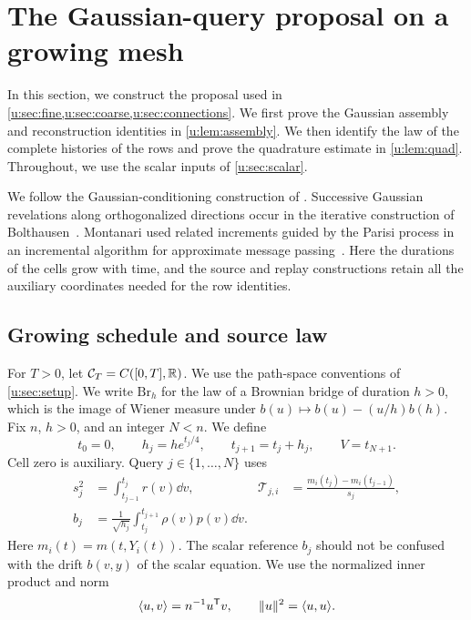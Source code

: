 \chapter{The Gaussian-query proposal on a growing mesh}\label{u:sec:proposal}

In this section, we construct the proposal used in
\cref{u:sec:fine,u:sec:coarse,u:sec:connections}. We first prove the
Gaussian assembly and reconstruction identities in
\cref{u:lem:assembly}. We then identify the law of the complete histories of the rows and prove the quadrature estimate in \cref{u:lem:quad}.
Throughout, we use the scalar inputs of \cref{u:sec:scalar}.

We follow the Gaussian-conditioning construction of
\cite[Section~4]{oai-typical-upper}. Successive Gaussian revelations along
orthogonalized directions occur in the iterative construction of
Bolthausen~\cite[Sections~2--3]{bolthausen-2014}. Montanari used related increments guided by the Parisi process in an
incremental algorithm for approximate message
passing~\cite[Sections~2 and~3.1]{montanari-2021}. Here the durations of the cells grow with
time, and the source and replay constructions retain all the auxiliary
coordinates needed for the row identities.

\section{Growing schedule and source law}\label{u:sec:proposal-schedule}

For $T>0$, let $\mathcal C_T=C([0,T],\mathbb R)$. We use the path-space
conventions of \cref{u:sec:setup}. We write $\mathrm{Br}_h$ for the law of a Brownian bridge of duration $h>0$,
which is the image of Wiener measure under
$b(u)\mapsto b(u)-(u/h)b(h)$.
Fix $n$, $h>0$, and an integer $N<n$. We define
\begin{equation}\label{u:eq:growing-schedule}
 t_0=0,\qquad h_j=h e^{t_j/4},\qquad
 t_{j+1}=t_j+h_j,\qquad V=t_{N+1}.
\end{equation}
Cell zero is auxiliary. Query $j\in\{1,\ldots,N\}$ uses
\begin{equation}\label{u:eq:query-targets}
 \begin{aligned}
 s_j^2&=\int_{t_{j-1}}^{t_j}r(v)\dd v,&
 \mathcal T_{j,i}&=\frac{m_i(t_j)-m_i(t_{j-1})}{s_j},\\
 b_j&=\frac1{\sqrt{h_j}}\int_{t_j}^{t_{j+1}}\rho(v)p(v)\dd v.
 \end{aligned}
\end{equation}
Here $m_i(t)=m(t,Y_i(t))$. The scalar reference $b_j$ should not be
confused with the drift $b(v,y)$ of the scalar equation. We use the normalized
inner product and norm
\[
 \langle u,v\rangle=n^{-1}u^{\mathsf T}v,\qquad
 \lVert u\rVert^2=\langle u,u\rangle.
\]


